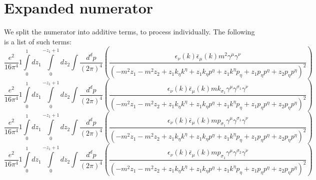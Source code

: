 \section*{Expanded numerator}
We split the numerator into additive terms, to process individually.  The following is a list of such terms:
\begin{dmath}\frac{e^{2}}{16 \pi^{4}}1\int\limits_{ 0 }^{ 1 } d{ z_{ 1 } }\int\limits_{ 0 }^{ - { z_{ 1 } } + 1 } d{ z_{ 2 } }\int\frac{d^d p }{ (2\pi)^4 }\left(\frac{\epsilon_{ \nu }({ k }) \bar{\epsilon}_{ \mu }({ k }) m^{2} { \gamma^{ \mu } } { \gamma^{ \nu } }}{\left(- m^{2} { z_{ 1 } } - m^{2} { z_{ 2 } } + { z_{ 1 } } { { k }_{ \eta } } { { k }^{ \eta } } + { z_{ 1 } } { { k }_{ \eta } } { { p }^{ \eta } } + { z_{ 1 } } { { k }^{ \eta } } { { p }_{ \eta } } + { z_{ 1 } } { { p }_{ \eta } } { { p }^{ \eta } } + { z_{ 2 } } { { p }_{ \eta } } { { p }^{ \eta } }\right)^{2}}\right)\end{dmath}
\begin{dmath}\frac{e^{2}}{16 \pi^{4}}1\int\limits_{ 0 }^{ 1 } d{ z_{ 1 } }\int\limits_{ 0 }^{ - { z_{ 1 } } + 1 } d{ z_{ 2 } }\int\frac{d^d p }{ (2\pi)^4 }\left(\frac{\epsilon_{ \nu }({ k }) \bar{\epsilon}_{ \mu }({ k }) m { { k }_{ \sigma_1 } } { \gamma^{ \mu } } { \gamma^{ \sigma_1 } } { \gamma^{ \nu } }}{\left(- m^{2} { z_{ 1 } } - m^{2} { z_{ 2 } } + { z_{ 1 } } { { k }_{ \eta } } { { k }^{ \eta } } + { z_{ 1 } } { { k }_{ \eta } } { { p }^{ \eta } } + { z_{ 1 } } { { k }^{ \eta } } { { p }_{ \eta } } + { z_{ 1 } } { { p }_{ \eta } } { { p }^{ \eta } } + { z_{ 2 } } { { p }_{ \eta } } { { p }^{ \eta } }\right)^{2}}\right)\end{dmath}
\begin{dmath}\frac{e^{2}}{16 \pi^{4}}1\int\limits_{ 0 }^{ 1 } d{ z_{ 1 } }\int\limits_{ 0 }^{ - { z_{ 1 } } + 1 } d{ z_{ 2 } }\int\frac{d^d p }{ (2\pi)^4 }\left(\frac{\epsilon_{ \nu }({ k }) \bar{\epsilon}_{ \mu }({ k }) m { { p }_{ \sigma_1 } } { \gamma^{ \mu } } { \gamma^{ \sigma_1 } } { \gamma^{ \nu } }}{\left(- m^{2} { z_{ 1 } } - m^{2} { z_{ 2 } } + { z_{ 1 } } { { k }_{ \eta } } { { k }^{ \eta } } + { z_{ 1 } } { { k }_{ \eta } } { { p }^{ \eta } } + { z_{ 1 } } { { k }^{ \eta } } { { p }_{ \eta } } + { z_{ 1 } } { { p }_{ \eta } } { { p }^{ \eta } } + { z_{ 2 } } { { p }_{ \eta } } { { p }^{ \eta } }\right)^{2}}\right)\end{dmath}
\begin{dmath}\frac{e^{2}}{16 \pi^{4}}1\int\limits_{ 0 }^{ 1 } d{ z_{ 1 } }\int\limits_{ 0 }^{ - { z_{ 1 } } + 1 } d{ z_{ 2 } }\int\frac{d^d p }{ (2\pi)^4 }\left(\frac{\epsilon_{ \nu }({ k }) \bar{\epsilon}_{ \mu }({ k }) m { { p }_{ \sigma_1 } } { \gamma^{ \mu } } { \gamma^{ \sigma_2 } } { \gamma^{ \nu } }}{\left(- m^{2} { z_{ 1 } } - m^{2} { z_{ 2 } } + { z_{ 1 } } { { k }_{ \eta } } { { k }^{ \eta } } + { z_{ 1 } } { { k }_{ \eta } } { { p }^{ \eta } } + { z_{ 1 } } { { k }^{ \eta } } { { p }_{ \eta } } + { z_{ 1 } } { { p }_{ \eta } } { { p }^{ \eta } } + { z_{ 2 } } { { p }_{ \eta } } { { p }^{ \eta } }\right)^{2}}\right)\end{dmath}
